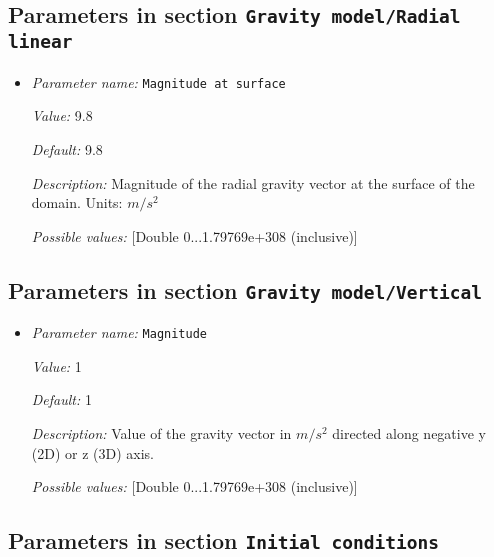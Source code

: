 \subsection{Parameters in section \tt Gravity model/Radial linear}
\label{parameters:Gravity_20model/Radial_20linear}

\begin{itemize}
\item {\it Parameter name:} {\tt Magnitude at surface}


{\it Value:} 9.8


{\it Default:} 9.8


{\it Description:} Magnitude of the radial gravity vector at the surface of the domain. Units: $m/s^2$


{\it Possible values:} [Double 0...1.79769e+308 (inclusive)]
\end{itemize}

\subsection{Parameters in section \tt Gravity model/Vertical}
\label{parameters:Gravity_20model/Vertical}

\begin{itemize}
\item {\it Parameter name:} {\tt Magnitude}


{\it Value:} 1


{\it Default:} 1


{\it Description:} Value of the gravity vector in $m/s^2$ directed along negative y (2D) or z (3D) axis.


{\it Possible values:} [Double 0...1.79769e+308 (inclusive)]
\end{itemize}

\subsection{Parameters in section \tt Initial conditions}
\label{parameters:Initial_20conditions}

